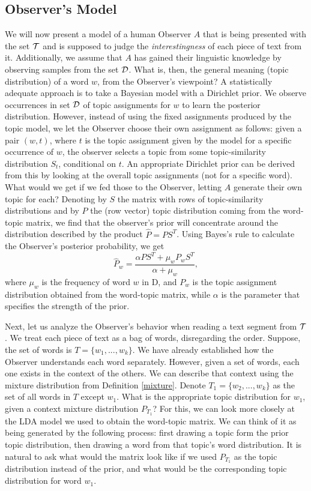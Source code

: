\documentclass{article} %
\begin{document}
\subsection{Observer's Model}
\label{sec:observer-model}

We will now present a model of a human Observer $A$ that is being presented with
the set ${\mathcal T}$ and is supposed to judge the {\em interestingness} of
each piece of text from it. Additionally, we assume that $A$ has
gained their linguistic knowledge by observing samples from the set
${\mathcal D}$. What is, then, the general meaning (topic distribution) of a word $w$,
from the Observer's viewpoint? A statistically adequate approach is to
take a Bayesian model with a Dirichlet prior. We observe occurrences
in set ${\mathcal D}$ of topic assignments for $w$ to learn the posterior
distribution. However, instead of using the fixed assignments produced
by the topic model, we let the Observer choose their own assignment as
follows: given a pair $(w,t)$, where $t$ is the topic assignment given
by the model for a specific occurrence of $w$, the observer selects a
topic from some topic-similarity distribution $S_t$, conditional on
$t$. An appropriate Dirichlet prior can be derived from this by
looking at the overall topic assignments (not for a specific
word). What would we get if we fed those to the Observer, letting $A$
generate their own topic for each?  Denoting by $S$ the matrix with
rows of topic-similarity distributions and by $P$ the (row vector) topic
distribution coming from the word-topic matrix, we find that the
observer's prior will concentrate around the distribution described by
the product $\widehat{P}=PS^T$. Using Bayes's rule to calculate the Observer's
posterior probability, we get
\[\widehat{P}_w=\frac{\alpha PS^T + \mu_w P_wS^T}{\alpha+\mu_w},\]
where $\mu_w$ is the frequency of word $w$ in D, and $P_w$ is the
topic assignment distribution obtained from the word-topic matrix,
while $\alpha$ is the parameter that specifies the strength of the
prior.

Next, let us analyze the Observer's behavior when reading a text
segment from ${\mathcal T}$. We treat each piece of text as a bag of words,
disregarding the order. Suppose, the set of words is $T=\{w_1,...,w_k\}$. We
have already established how the Observer understands each word
separately. However, given a set of words, each one exists in the
context of the others. We can describe that context using the mixture
distribution from Definition \ref{mixture}. Denote
$T_1=\{w_2,...,w_k\}$ as the set of all words in $T$ except
$w_1$. What is the appropriate topic distribution for $w_1$, given a
context mixture distribution $P_{T_1}$? For this, we can look more
closely at the LDA model we used to obtain the word-topic matrix. We
can think of it as being generated by the following process: first
drawing a topic form the prior topic distribution, then drawing a word
from that topic's word distribution. It is natural to ask what would
the matrix look like if we used $P_{T_1}$ as the topic distribution
instead of the prior, and what would be the corresponding topic
distribution for word $w_1$. 
\end{document}
